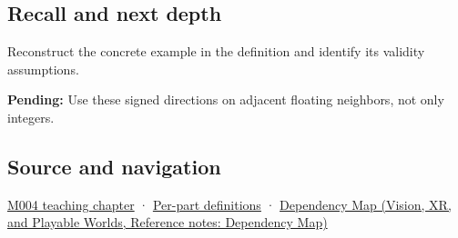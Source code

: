 \subsection{Recall and next depth}\label{appendix-637d164ae5ca-recall-and-next-depth}

Reconstruct the concrete example in the definition and identify its validity assumptions.

\textbf{Pending:} Use these signed directions on adjacent floating neighbors, not only integers.

\subsection{Source and navigation}\label{appendix-637d164ae5ca-source-and-navigation}

\hyperref[01-foundations-i-ch001-a-stretching-ruler-for-real-valued-quantities]{M004 teaching chapter} · \hyperref[appendix-fd090d982a15-m004---parts-61-76]{Per-part definitions} · \href{../07-Vision-XR-and-Playable-Worlds/main.pdf\#nameddest=appendix-4ad47bdd269a}{Dependency Map (Vision, XR, and Playable Worlds, Reference notes: Dependency Map)}
